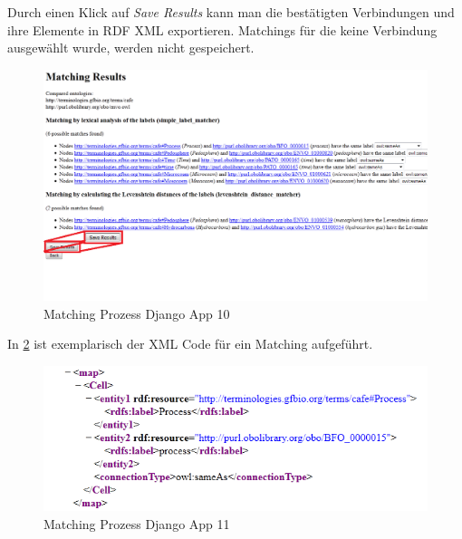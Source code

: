 		\pagebreak[4]
		Durch einen Klick auf \textit{Save Results} kann man die bestätigten
		Verbindungen und ihre Elemente in RDF XML exportieren. Matchings für die keine
		Verbindung ausgewählt wurde, werden nicht gespeichert.
		\begin{figure}[h!]
		\centering
		\includegraphics[width=1.0\textwidth]{pics/SimpleOntologyMatcher-Process10.png}
		\caption{Matching Prozess Django App 10}
		\label{fig13}
		\end{figure}
		
		\pagebreak[4]
		In \ref{fig14} ist exemplarisch der XML Code für ein Matching aufgeführt.
		\begin{figure}[h!]
		\centering
		\includegraphics[width=1.0\textwidth]{pics/SimpleOntologyMatcher-Process11.png}
		\caption{Matching Prozess Django App 11}
		\label{fig14}
		\end{figure}
		\pagebreak[4]
		
